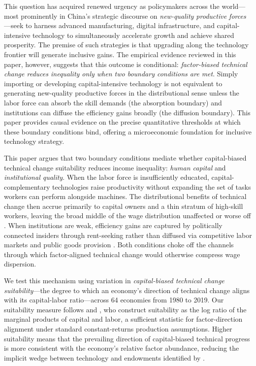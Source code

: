 \documentclass[12pt]{article}
\begin{document}
This question has acquired renewed urgency as policymakers across the
world---most prominently in China's strategic discourse on
\emph{new-quality productive forces}---seek to harness advanced
manufacturing, digital infrastructure, and capital-intensive technology
to simultaneously accelerate growth and achieve shared prosperity.
The premise of such strategies is that upgrading along the technology
frontier will generate inclusive gains.
The empirical evidence reviewed in this paper, however, suggests that
this outcome is conditional: \emph{factor-biased technical change
reduces inequality only when two boundary conditions are met}.
Simply importing or developing capital-intensive technology is not
equivalent to generating new-quality productive forces in the
distributional sense unless the labor force can absorb the skill
demands (the absorption boundary) and institutions can diffuse
the efficiency gains broadly (the diffusion boundary).
This paper provides causal evidence on the precise quantitative
thresholds at which these boundary conditions bind, offering a
microeconomic foundation for inclusive technology strategy.

This paper argues that two boundary conditions mediate whether
capital-biased technical change suitability reduces income inequality:
\emph{human capital} and \emph{institutional quality}.
When the labor force is insufficiently educated, capital-complementary
technologies raise productivity without expanding the set of tasks
workers can perform alongside machines. The distributional benefits
of technical change then accrue primarily to capital owners and a
thin stratum of high-skill workers, leaving the broad middle of
the wage distribution unaffected or worse off
\citep{krusell2000capitalskill, moll2022uneven}.
When institutions are weak, efficiency gains are captured by politically
connected insiders through rent-seeking rather than diffused via
competitive labor markets and public goods provision
\citep{acemoglu2005institutions, hall1999why}.
Both conditions choke off the channels through which factor-aligned
technical change would otherwise compress wage dispersion.

We test this mechanism using variation in
\emph{capital-biased technical change suitability}---the degree to
which an economy's direction of technical change aligns with its
capital-labor ratio---across 64 economies from 1980 to 2019.
Our suitability measure follows \citet{li2026prosperity} and
\citet{li2024suitability}, who construct suitability as the log ratio
of the marginal products of capital and labor, a sufficient statistic
for factor-direction alignment under standard constant-returns
production assumptions. Higher suitability means that the prevailing
direction of capital-biased technical progress is more consistent with
the economy's relative factor abundance, reducing the implicit wedge
between technology and endowments identified by
\citet{acemoglu2001productivity}.
\end{document}
